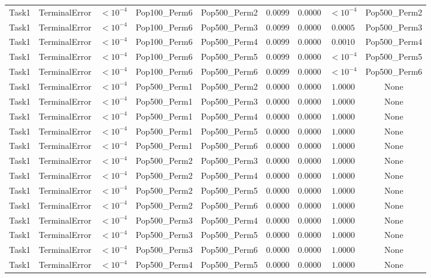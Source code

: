 \documentclass[8pt]{article}
\begin{document}
\begin{longtable}{llccccccc}
Task1 & TerminalError & $< 10^{-4}$ & Pop100\_Perm6 & Pop500\_Perm2 & 0.0099 & 0.0000 & $< 10^{-4}$ & Pop500\_Perm2 \\
Task1 & TerminalError & $< 10^{-4}$ & Pop100\_Perm6 & Pop500\_Perm3 & 0.0099 & 0.0000 & $0.0005$ & Pop500\_Perm3 \\
Task1 & TerminalError & $< 10^{-4}$ & Pop100\_Perm6 & Pop500\_Perm4 & 0.0099 & 0.0000 & $0.0010$ & Pop500\_Perm4 \\
Task1 & TerminalError & $< 10^{-4}$ & Pop100\_Perm6 & Pop500\_Perm5 & 0.0099 & 0.0000 & $< 10^{-4}$ & Pop500\_Perm5 \\
Task1 & TerminalError & $< 10^{-4}$ & Pop100\_Perm6 & Pop500\_Perm6 & 0.0099 & 0.0000 & $< 10^{-4}$ & Pop500\_Perm6 \\
Task1 & TerminalError & $< 10^{-4}$ & Pop500\_Perm1 & Pop500\_Perm2 & 0.0000 & 0.0000 & $1.0000$ & None \\
Task1 & TerminalError & $< 10^{-4}$ & Pop500\_Perm1 & Pop500\_Perm3 & 0.0000 & 0.0000 & $1.0000$ & None \\
Task1 & TerminalError & $< 10^{-4}$ & Pop500\_Perm1 & Pop500\_Perm4 & 0.0000 & 0.0000 & $1.0000$ & None \\
Task1 & TerminalError & $< 10^{-4}$ & Pop500\_Perm1 & Pop500\_Perm5 & 0.0000 & 0.0000 & $1.0000$ & None \\
Task1 & TerminalError & $< 10^{-4}$ & Pop500\_Perm1 & Pop500\_Perm6 & 0.0000 & 0.0000 & $1.0000$ & None \\
Task1 & TerminalError & $< 10^{-4}$ & Pop500\_Perm2 & Pop500\_Perm3 & 0.0000 & 0.0000 & $1.0000$ & None \\
Task1 & TerminalError & $< 10^{-4}$ & Pop500\_Perm2 & Pop500\_Perm4 & 0.0000 & 0.0000 & $1.0000$ & None \\
Task1 & TerminalError & $< 10^{-4}$ & Pop500\_Perm2 & Pop500\_Perm5 & 0.0000 & 0.0000 & $1.0000$ & None \\
Task1 & TerminalError & $< 10^{-4}$ & Pop500\_Perm2 & Pop500\_Perm6 & 0.0000 & 0.0000 & $1.0000$ & None \\
Task1 & TerminalError & $< 10^{-4}$ & Pop500\_Perm3 & Pop500\_Perm4 & 0.0000 & 0.0000 & $1.0000$ & None \\
Task1 & TerminalError & $< 10^{-4}$ & Pop500\_Perm3 & Pop500\_Perm5 & 0.0000 & 0.0000 & $1.0000$ & None \\
Task1 & TerminalError & $< 10^{-4}$ & Pop500\_Perm3 & Pop500\_Perm6 & 0.0000 & 0.0000 & $1.0000$ & None \\
Task1 & TerminalError & $< 10^{-4}$ & Pop500\_Perm4 & Pop500\_Perm5 & 0.0000 & 0.0000 & $1.0000$ & None \\

\end{longtable}
\end{document}

